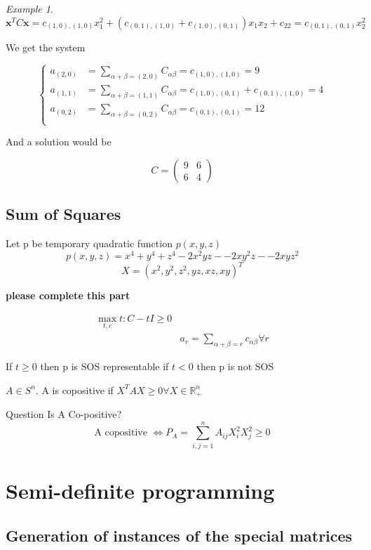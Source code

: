 \documentclass[onecolumn,11pt,a4paper]{article}
\theoremstyle{plain}  %
\theoremstyle{remark}  %
\newtheorem{example}[theorem]{Example}
\begin{document}
\begin{example}
\[
	\mathbf{x}^T C \mathbf{x} = c_{(1, 0),(1, 0)} x_1^2 + \left( c_{(0, 1),(1, 0)} + c_{(1,
	0),(0,1)} \right) x_1 x_2 + c_{22} = c_{(0, 1),(0, 1)} x_2^2
\]

We get the system

\begin{equation*}
	\left\{ \begin{aligned}
		a_{(2,0)} & = \sum_{\alpha + \beta = (2, 0)} C_{\alpha \beta} = c_{(1, 0),(1,
		0)} = 9\\
		a_{(1,1)} & = \sum_{\alpha + \beta = (1, 1)} C_{\alpha \beta} = c_{(1, 0),(0, 1)}
		+ c_{(0, 1),(1, 0)} = 4\\
		a_{(0,2)} & = \sum_{\alpha + \beta = (0, 2)} C_{\alpha \beta} = c_{(0, 1),(0,
		1)} = 12\\
	\end{aligned} \right.
\end{equation*}

And a solution would be

\begin{equation*}
	C = \begin{pmatrix}9 & 6 \\ 6 & 4 \end{pmatrix} 
\end{equation*}

\end{example}

\subsection{Sum of Squares}

Let p be temporary quadratic function  $p(x,y,z)$
\[ 
p(x,y,z) = x^4 + y^4 + z^4 - 2x^2yz -  - 2xy^2z -  - 2xyz^2 
\]
\[
X= ( x^2, y^2, z^2, yz, xz, xy)^T 
\]

\textbf{please complete this part}


\begin{align}
\max_{t, c} t: C - tI \geq 0 \\
& a_r = \sum_{\alpha + \beta= r} c_{\alpha  \beta} \forall r
\end{align}

If $t \geq 0 $ then p is SOS representable
if $t<0$ then p is not SOS

$A \in S^n $. A is copositive if $X^T A X \geq 0 \forall X \in \mathbb{R}_{+}^n$ 

Question Is A Co-positive?
\[
\text{A copositive } \Leftrightarrow P_A =\sum_{i, j = 1}^n A_{ij}X_i^2 X_j^2  \geq 0 \]
\section{Semi-definite programming}
\subsection{Generation of instances of the special matrices}
\label{sub:generation}
\newpage
\nocite{afonin2020extreme}

\end{document}
